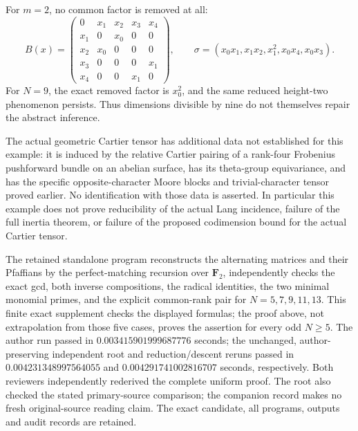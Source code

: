 \begin{remark}
\label{rem:abstract-Pfaffian-height-two-scope}
For \(m=2\), no common factor is removed at all:
\[
 B(x)=
 \begin{pmatrix}
 0&x_1&x_2&x_3&x_4\\
 x_1&0&x_0&0&0\\
 x_2&x_0&0&0&0\\
 x_3&0&0&0&x_1\\
 x_4&0&0&x_1&0
 \end{pmatrix},\qquad
 \sigma=(x_0x_1,x_1x_2,x_1^2,x_0x_4,x_0x_3).                    \tag{PH2.9}
\]
For \(N=9\), the exact removed factor is \(x_0^2\), and the
same reduced height-two phenomenon persists.  Thus dimensions
divisible by nine do not themselves repair the abstract inference.

The actual geometric Cartier tensor has additional data not
established for this example: it is induced by the relative Cartier
pairing of a rank-four Frobenius pushforward bundle on an abelian
surface, has its theta-group equivariance, and has the specific
opposite-character Moore blocks and trivial-character tensor proved
earlier.  No identification with those data is asserted.
In particular this example does not prove reducibility of the actual
Lang incidence, failure of the full inertia theorem, or failure of
the proposed codimension bound for the actual Cartier tensor.

The retained standalone program
reconstructs the alternating matrices and their Pfaffians by the
perfect-matching recursion over \(\mathbf F_2\), independently checks
the exact gcd, both inverse compositions, the radical identities,
the two minimal monomial primes, and the explicit common-rank pair
for \(N=5,7,9,11,13\).  This finite exact supplement checks the
displayed formulas; the proof above, not extrapolation from those
five cases, proves the assertion for every odd \(N\ge5\).
The author run passed in \(0.003415901999687776\) seconds;
the unchanged, author-preserving independent root and reduction/descent
reruns passed in \(0.004231348997564055\) and
\(0.004291741002816707\) seconds, respectively.
Both reviewers independently rederived the complete uniform proof.
The root also checked the stated primary-source comparison; the
companion record makes no fresh original-source reading claim.
The exact candidate, all programs, outputs and audit records are retained.
\end{remark}

